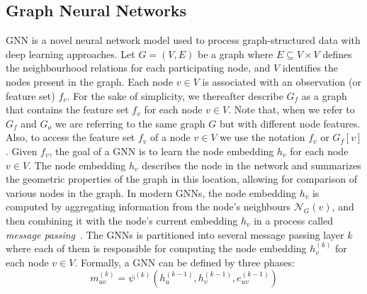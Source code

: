 \subsection{Graph Neural Networks}
 \ac{GNN} is a novel neural network model used to process graph-structured data with deep learning approaches.
%
Let $G = (V, E)$ be a graph  
where $E\subseteq V\times V$ defines the neighbourhood relations for each participating node, 
and $V$ identifies the nodes present in the graph. %
% 
Each node $v \in V$ is associated with an observation (or feature set) $f_v$.
For the sake of simplicity, 
 we thereafter describe $G_f$ as a graph that contains the feature set $f_v$ for each node $v \in V$.
 Note that, when we refer to $G_f$ and $G_o$ we are referring to the same graph $G$ but with different node features.
 Also, to access the feature set $f_v$ of a node $v \in V$ we use the notation $f_v$ or $G_f[v]$.
%
Given $f_v$, %
 the goal of a \ac{GNN} is to learn the node embedding $h_v$ for each node $v \in V$. 
 The node embedding $h_v$ describes the node in the network and summarizes the geometric properties of the graph in this location, allowing for comparison of various nodes in the graph.
%
In modern \acp{GNN}, the node embedding $h_v$ is computed by aggregating information from the node's neighbours $\mathcal{N}_G(v)$,
 and then combining it with the node's current embedding $h_v$ in a process called \emph{message passing}~\cite{DBLP:conf/icml/GilmerSRVD17}.
%
The \acp{GNN} is partitioned into several message passing layer $k$
 where each of them is responsible for computing the node embedding $h_v^{(k)}$ for each node $v \in V$.
Formally, a \ac{GNN} can be defined by three phases:
\begin{equation}
m^{(k)}_{uv} = \psi^{(k)}\left(h_u^{(k-1)}, h_v^{(k-1)}, e^{(k-1)}_{uv}\right) 
\end{equation}

